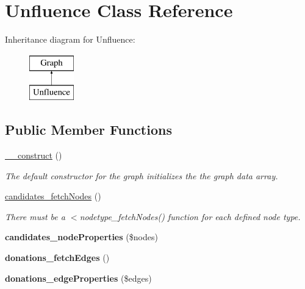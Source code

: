 \hypertarget{classUnfluence}{
\section{Unfluence Class Reference}
\label{classUnfluence}
}
Inheritance diagram for Unfluence:\begin{figure}[H]
\begin{center}
\leavevmode
\includegraphics[height=2.000000cm]{classUnfluence}
\end{center}
\end{figure}
\subsection*{Public Member Functions}
\begin{DoxyCompactItemize}
\item 
\hyperlink{classUnfluence_a051adc1ac4ae2294936c39afce839db6}{\_\-\_\-construct} ()
\begin{DoxyCompactList}\small\item\em The default constructor for the graph initializes the the graph data array. \item\end{DoxyCompactList}\item 
\hyperlink{classUnfluence_a8d4f12eca0b3e53007c81bea13240147}{candidates\_\-fetchNodes} ()
\begin{DoxyCompactList}\small\item\em There must be a $<$nodetype\_\-fetchNodes() function for each defined node type. \item\end{DoxyCompactList}\item 
\hypertarget{classUnfluence_aea5260b7f98790032a850129eaf95d7f}{
{\bfseries candidates\_\-nodeProperties} (\$nodes)}
\label{classUnfluence_aea5260b7f98790032a850129eaf95d7f}

\item 
\hypertarget{classUnfluence_a82799f0fcafeeac76f5d2e487efe0e1a}{
{\bfseries donations\_\-fetchEdges} ()}
\label{classUnfluence_a82799f0fcafeeac76f5d2e487efe0e1a}

\item 
\hypertarget{classUnfluence_aa1c27e10f5c6306c8a1ad6249a5ae1da}{
{\bfseries donations\_\-edgeProperties} (\$edges)}
\label{classUnfluence_aa1c27e10f5c6306c8a1ad6249a5ae1da}

\end{DoxyCompactItemize}


